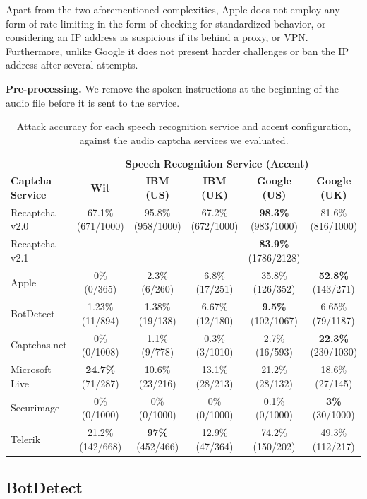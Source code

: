 Apart from the two aforementioned complexities, Apple does not employ any form of rate limiting in 
the form of checking for standardized behavior, or considering an IP address as suspicious if its behind a proxy, or VPN.
Furthermore, unlike Google \re it does not present harder challenges or ban the IP address after several attempts. 

\textbf{Pre-processing.} We remove the spoken instructions at the beginning of the audio file
before it is sent to the service.

\begin{table}[t]
\centering
\caption{Attack accuracy for each speech recognition service and accent configuration, against the audio captcha services we evaluated.}
\begin{tabular}{lccccc}
\toprule
&\multicolumn{5}{c}{\textbf{Speech Recognition Service (Accent)}}\\
\cmidrule{2-6}
\textbf{Captcha Service}& \textbf{Wit}& \textbf{IBM (US)} & \textbf{ IBM (UK)} & \textbf{Google (US)} & \textbf{Google (UK)} \\
\hline
Recaptcha v2.0 & 67.1\% (671/1000) & 95.8\% (958/1000) & 67.2\% (672/1000) & \textbf{98.3\%} (983/1000) & 81.6\% (816/1000) \\
\rowcolor{Gray}
Recaptcha v2.1 & -  & - & -  & \textbf{83.9\%} (1786/2128) & - \\
Apple  & 0\% (0/365)  & 2.3\% (6/260) & 6.8\% (17/251) & 35.8\% (126/352) & \textbf{52.8\%} (143/271) \\
\rowcolor{Gray}
BotDetect  & 1.23\% (11/894)  & 1.38\% (19/138) & 6.67\% (12/180) & \textbf{9.5\%} (102/1067)  & 6.65\% (79/1187) \\
Captchas.net  & 0\% (0/1008) & 1.1\% (9/778)  & 0.3\% (3/1010)  & 2.7\% (16/593) & \textbf{22.3\%} (230/1030) \\
\rowcolor{Gray}
Microsoft Live & \textbf{24.7\%} (71/287) & 10.6\% (23/216)  & 13.1\% (28/213)  & 21.2\% (28/132)  & 18.6\% (27/145) \\
Securimage  & 0\% (0/1000)  & 0\% (0/1000) & 0\% (0/1000) & 0.1\% (0/1000) & \textbf{3\%} (30/1000) \\
\rowcolor{Gray}
Telerik  & 21.2\% (142/668)  & \textbf{97\%} (452/466) & 12.9\% (47/364) & 74.2\% (150/202) & 49.3\% (112/217) \\
\bottomrule
\end{tabular}
\label{tab:combinations}
\end{table}


\subsection{BotDetect}

